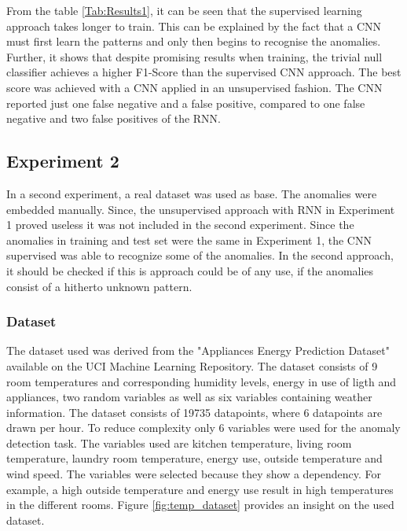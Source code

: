 From the table \ref{Tab:Results1}, it can be seen that the supervised learning approach takes longer to train. This can be explained by the fact that a CNN must first learn the patterns and only then begins to recognise the anomalies. Further, it shows that despite promising results when training, the trivial null classifier achieves a higher F1-Score than the supervised CNN approach. 
The best score was achieved with a CNN applied in an unsupervised fashion. The CNN reported just one false negative and a false positive, compared to one false negative and two false positives of the RNN.

\newpage

\subsection{Experiment 2}
In a second experiment, a real dataset was used as base. The anomalies were embedded manually. Since, the unsupervised approach with RNN in Experiment 1 proved useless it was not included in the second experiment. Since the anomalies in training and test set were the same in Experiment 1, the CNN supervised was able to recognize some of the anomalies. In the second approach, it should be checked if this is approach could be of any use, if the anomalies consist of a hitherto unknown pattern.

\subsubsection{Dataset}
The dataset used was derived from the "Appliances Energy Prediction Dataset" available on the UCI Machine Learning Repository. The dataset consists of 9 room temperatures and corresponding humidity levels, energy in use of ligth and appliances, two random variables as well as six variables containing weather information. The dataset consists of 19735 datapoints, where 6 datapoints are drawn per hour. To reduce complexity only 6 variables were used for the anomaly detection task. The variables used are kitchen temperature, living room temperature, laundry room temperature, energy use, outside temperature and wind speed. The variables were selected because they show a dependency. For example, a high outside temperature and energy use result in high temperatures in the different rooms. Figure \ref{fig:temp_dataset} provides an insight on the used dataset. 

